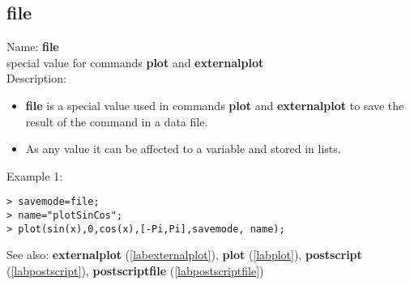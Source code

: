 \subsection{file}
\label{labfile}
\noindent Name: \textbf{file}\\
special value for commands \textbf{plot} and \textbf{externalplot}\\
\noindent Description: \begin{itemize}

\item \textbf{file} is a special value used in commands \textbf{plot} and \textbf{externalplot} to save
   the result of the command in a data file.

\item As any value it can be affected to a variable and stored in lists.
\end{itemize}
\noindent Example 1: 
\begin{center}\begin{minipage}{15cm}\begin{Verbatim}[frame=single]
> savemode=file;
> name="plotSinCos";
> plot(sin(x),0,cos(x),[-Pi,Pi],savemode, name);
\end{Verbatim}
\end{minipage}\end{center}
See also: \textbf{externalplot} (\ref{labexternalplot}), \textbf{plot} (\ref{labplot}), \textbf{postscript} (\ref{labpostscript}), \textbf{postscriptfile} (\ref{labpostscriptfile})
